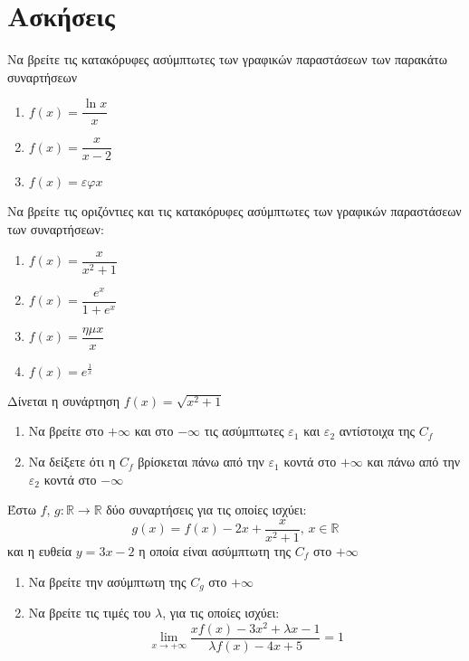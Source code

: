 \documentclass{presentation}
\begin{document}
\section{Ασκήσεις}
\begin{askisi}
    Να βρείτε τις κατακόρυφες ασύμπτωτες των γραφικών παραστάσεων των παρακάτω συναρτήσεων
    \begin{enumerate}
        \item<1-> $f(x)=\dfrac{\ln x}{x}$
        \item<2-> $f(x)=\dfrac{x}{x-2}$
        \item<3-> $f(x)=εφ x$
    \end{enumerate}

\end{askisi}

\begin{askisi}
    Να βρείτε τις οριζόντιες και τις κατακόρυφες ασύμπτωτες των γραφικών παραστάσεων των συναρτήσεων:
    \begin{enumerate}
        \item<1-> $f(x)=\dfrac{x}{x^2+1}$
        \item<2-> $f(x)=\dfrac{e^x}{1+e^x}$
        \item<3-> $f(x)=\dfrac{ημx}{x}$
        \item<4-> $f(x)=e^{\frac{1}{x}}$
    \end{enumerate}

\end{askisi}

\begin{askisi}
    Δίνεται η συνάρτηση $f(x)=\sqrt{x^2+1}$
    \begin{enumerate}
        \item<1-> Να βρείτε στο $+\infty$ και στο $-\infty$ τις ασύμπτωτες $ε_1$ και $ε_2$ αντίστοιχα της $C_f$
        \item<2-> Να δείξετε ότι η $C_f$ βρίσκεται πάνω από την $ε_1$ κοντά στο $+\infty$ και πάνω από την $ε_2$ κοντά στο $-\infty$
    \end{enumerate}

\end{askisi}

\begin{askisi}
    Έστω $f$, $g:\mathbb{R}\to\mathbb{R}$ δύο συναρτήσεις για τις οποίες ισχύει:
    $$g(x)=f(x)-2x+\dfrac{x}{x^2+1} \text{, } x\in\mathbb{R}$$
    και η ευθεία $y=3x-2$ η οποία είναι ασύμπτωτη της $C_f$ στο $+\infty$
    \begin{enumerate}
        \item<1-> Να βρείτε την ασύμπτωτη της $C_g$ στο $+\infty$
        \item<2-> Να βρείτε τις τιμές του $λ$, για τις οποίες ισχύει:
            $$\lim\limits_{x \to +\infty}{ \dfrac{xf(x)-3x^2+λx-1}{λf(x)-4x+5} }=1$$
    \end{enumerate}

\end{askisi}
\end{document}
